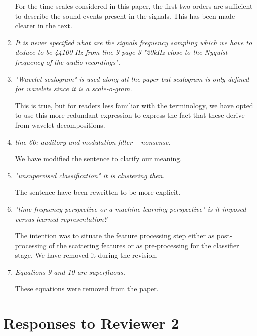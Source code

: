 \documentclass[10pt]{article}
\begin{document}
\begin{enumerate}
For the time scales considered in this paper, the first two orders are sufficient to describe the sound events present in the signals. This has been made clearer in the text.

\item \emph{It is never specified what are the signals frequency sampling which we have to deduce to be 44100 Hz from line 9 page 3 "20kHz close to the Nyquist frequency of the audio recordings".}



\item \emph{"Wavelet scalogram" is used along all the paper but scalogram is only defined for wavelets since 
it is a scale-o-gram.}

This is true, but for readers less familiar with the terminology, we have opted to use this more redundant expression to express the fact that these derive from wavelet decompositions.

\item \emph{line 60: auditory and modulation filter – nonsense.}

We have modified the sentence to clarify our meaning.

\item \emph{"unsupervised classification" it is clustering then.}

The sentence have been rewritten to be more explicit.

\item \emph{"time-frequency perspective or a machine learning perspective" is it imposed versus learned representation? }

The intention was to situate the feature processing step either as post-processing of the scattering features or as pre-processing for the classifier stage. We have removed it during the revision.

\item \emph{Equations 9 and 10 are superfluous.}

These equations were removed from the paper.

\end{enumerate}

\section{Responses to Reviewer 2}
\end{document}
